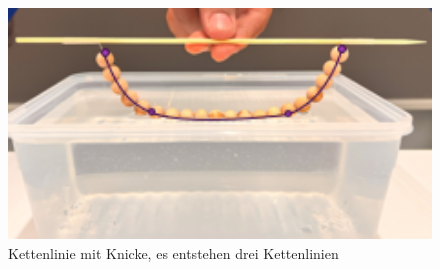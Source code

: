 \begin{figure}
	\centering
	\includegraphics[width=1\textwidth]{papers/kettenlinie/images/kettenlinie_curves.png}
	\caption{Kettenlinie mit Knicke, es entstehen drei Kettenlinien}
	\label{fig:Kettenlinie-Curves}
\end{figure}
